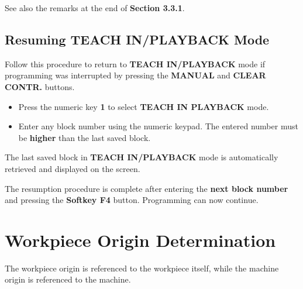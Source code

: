 See also the remarks at the end of \textbf{Section 3.3.1}.

\newpage

\subsection{Resuming TEACH IN/PLAYBACK Mode}

Follow this procedure to return to \textbf{TEACH IN/PLAYBACK} mode if programming was interrupted by pressing the \textbf{MANUAL} and \textbf{CLEAR CONTR.} buttons.

\begin{itemize}
    \vspace{.6cm}
    \vspace{.6cm}
    \item Press the numeric key \textbf{1} to select \textbf{TEACH IN PLAYBACK} mode.
\end{itemize}

\begin{itemize}
    \vspace{.6cm}
    \item Enter any block number using the numeric keypad. The entered number must be \textbf{higher} than the last saved block.
    \vspace{.6cm}
\end{itemize}

\vspace{.5cm}
The last saved block in \textbf{TEACH IN/PLAYBACK} mode is automatically retrieved and displayed on the screen.

The resumption procedure is complete after entering the \textbf{next block number} and pressing the \textbf{Softkey F4} button. Programming can now continue.

\newpage

\section{Workpiece Origin Determination}

The workpiece origin is referenced to the workpiece itself, while the machine origin is referenced to the machine.

